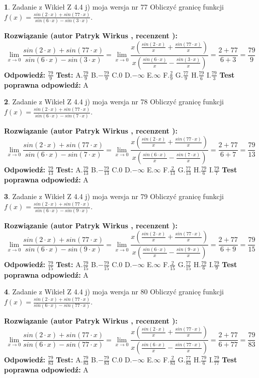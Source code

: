 \documentclass[12pt, a4paper]{article}
\theoremstyle{definition} %
\newtheorem{zad}{}
\newcommand{\zadStart}[1]{\begin{zad}#1\newline}
\newcommand{\zadStop}{\end{zad}}
\newcommand{\rozwStart}[2]{\noindent \textbf{Rozwiązanie (autor #1 , recenzent #2): }\newline}
\newcommand{\rozwStop}{\newline}
\newcommand{\odpStart}{\noindent \textbf{Odpowiedź:}\newline}
\newcommand{\odpStop}{\newline}
\newcommand{\testStart}{\noindent \textbf{Test:}\newline}
\newcommand{\testStop}{\newline}
\newcommand{\kluczStart}{\noindent \textbf{Test poprawna odpowiedź:}\newline}
\newcommand{\kluczStop}{\newline}
\begin{document}
\zadStart{Zadanie z Wikieł Z 4.4 j) moja wersja nr 77}
Obliczyć granicę funkcji $f(x)=\frac{sin(2\cdot x) +sin(77\cdot x)}{sin(6\cdot x) -sin(3\cdot x)}$.
\zadStop
\rozwStart{Patryk Wirkus}{}
$$\lim\limits_{x\to 0}\frac{sin(2\cdot x) +sin(77\cdot x)}{sin(6\cdot x) -sin(3\cdot x)}=\lim\limits_{x\to 0}\frac{x(\frac{sin(2\cdot x)}{x}+\frac{sin(77\cdot x)}{x})}{x(\frac{sin(6\cdot x)}{x}-\frac{sin(3\cdot x)}{x})}=\frac{2+77}{6+3} = \frac{79}{9}$$
\rozwStop
\odpStart
$\frac{79}{9}$
\odpStop
\testStart
A.$\frac{79}{9}$
B.$-\frac{79}{9}$
C.$0$
D.$-\infty$
E.$\infty$
F.$\frac{2}{9}$
G.$\frac{77}{9}$
H.$\frac{79}{6}$
I.$\frac{79}{3}$
\testStop
\kluczStart
A
\kluczStop



\zadStart{Zadanie z Wikieł Z 4.4 j) moja wersja nr 78}
Obliczyć granicę funkcji $f(x)=\frac{sin(2\cdot x) +sin(77\cdot x)}{sin(6\cdot x) -sin(7\cdot x)}$.
\zadStop
\rozwStart{Patryk Wirkus}{}
$$\lim\limits_{x\to 0}\frac{sin(2\cdot x) +sin(77\cdot x)}{sin(6\cdot x) -sin(7\cdot x)}=\lim\limits_{x\to 0}\frac{x(\frac{sin(2\cdot x)}{x}+\frac{sin(77\cdot x)}{x})}{x(\frac{sin(6\cdot x)}{x}-\frac{sin(7\cdot x)}{x})}=\frac{2+77}{6+7} = \frac{79}{13}$$
\rozwStop
\odpStart
$\frac{79}{13}$
\odpStop
\testStart
A.$\frac{79}{13}$
B.$-\frac{79}{13}$
C.$0$
D.$-\infty$
E.$\infty$
F.$\frac{2}{13}$
G.$\frac{77}{13}$
H.$\frac{79}{6}$
I.$\frac{79}{7}$
\testStop
\kluczStart
A
\kluczStop



\zadStart{Zadanie z Wikieł Z 4.4 j) moja wersja nr 79}
Obliczyć granicę funkcji $f(x)=\frac{sin(2\cdot x) +sin(77\cdot x)}{sin(6\cdot x) -sin(9\cdot x)}$.
\zadStop
\rozwStart{Patryk Wirkus}{}
$$\lim\limits_{x\to 0}\frac{sin(2\cdot x) +sin(77\cdot x)}{sin(6\cdot x) -sin(9\cdot x)}=\lim\limits_{x\to 0}\frac{x(\frac{sin(2\cdot x)}{x}+\frac{sin(77\cdot x)}{x})}{x(\frac{sin(6\cdot x)}{x}-\frac{sin(9\cdot x)}{x})}=\frac{2+77}{6+9} = \frac{79}{15}$$
\rozwStop
\odpStart
$\frac{79}{15}$
\odpStop
\testStart
A.$\frac{79}{15}$
B.$-\frac{79}{15}$
C.$0$
D.$-\infty$
E.$\infty$
F.$\frac{2}{15}$
G.$\frac{77}{15}$
H.$\frac{79}{6}$
I.$\frac{79}{9}$
\testStop
\kluczStart
A
\kluczStop



\zadStart{Zadanie z Wikieł Z 4.4 j) moja wersja nr 80}
Obliczyć granicę funkcji $f(x)=\frac{sin(2\cdot x) +sin(77\cdot x)}{sin(6\cdot x) -sin(77\cdot x)}$.
\zadStop
\rozwStart{Patryk Wirkus}{}
$$\lim\limits_{x\to 0}\frac{sin(2\cdot x) +sin(77\cdot x)}{sin(6\cdot x) -sin(77\cdot x)}=\lim\limits_{x\to 0}\frac{x(\frac{sin(2\cdot x)}{x}+\frac{sin(77\cdot x)}{x})}{x(\frac{sin(6\cdot x)}{x}-\frac{sin(77\cdot x)}{x})}=\frac{2+77}{6+77} = \frac{79}{83}$$
\rozwStop
\odpStart
$\frac{79}{83}$
\odpStop
\testStart
A.$\frac{79}{83}$
B.$-\frac{79}{83}$
C.$0$
D.$-\infty$
E.$\infty$
F.$\frac{2}{83}$
G.$\frac{77}{83}$
H.$\frac{79}{6}$
I.$\frac{79}{77}$
\testStop
\kluczStart
A
\kluczStop
\end{document}
